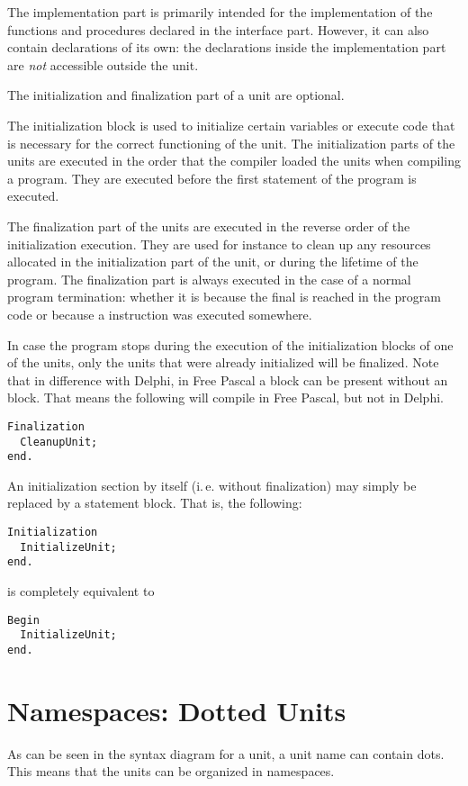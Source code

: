 The implementation part is primarily intended for the implementation of the
functions and procedures declared in the interface part. However, it can
also contain declarations of its own: the declarations inside the
implementation part are {\em not} accessible outside the unit.

The initialization and finalization part of a unit are optional.

The initialization block is used to initialize certain variables or
execute code that is necessary for the correct functioning of the unit.
The initialization parts of the units
are executed in the order that the compiler loaded the units when compiling
a program. They are executed before the first statement of the program is
executed.

The finalization part of the units are executed in the reverse order of the
initialization execution. They are used for instance to clean up any resources
allocated in the initialization part  of the unit, or during the lifetime of
the program. The finalization part is always executed in the case of a
normal program termination: whether it is because the final  is
reached in the program code or because a  instruction was executed
somewhere.

In case the program stops during the execution of the initialization blocks
of one of the units, only the units that were already initialized will be
finalized.
Note that in difference with Delphi, in Free Pascal a  block can be
present without an  block. That means the following will
compile in Free Pascal, but not in Delphi.
\begin{verbatim}
Finalization
  CleanupUnit;
end.
\end{verbatim}
An initialization section by itself (i.\,e. without finalization) may simply be
replaced by a statement block. That is, the following:
\begin{verbatim}
Initialization
  InitializeUnit;
end.
\end{verbatim}
is completely equivalent to
\begin{verbatim}
Begin
  InitializeUnit;
end.
\end{verbatim}

\section{Namespaces: Dotted Units}
As can be seen in the syntax diagram for a unit, a unit name can contain dots.
This means that the units can be organized in namespaces.

